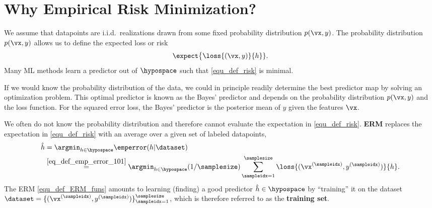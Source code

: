 \documentclass[12pt]{report}
\begin{document}

\section{Why Empirical Risk Minimization?} 
\label{equ_sec_emp_risk_approximates_expected_loss}

We assume that datapoints are i.i.d.\ realizations drawn from some fixed 
probability distribution $p(\vx,y)$. The probability distribution $p(\vx,y)$ 
allows us to define the expected loss or risk 
\begin{equation}
\label{equ_def_risk} 
\expect \big \{ \loss{(\vx,y)}{h} \}.
\end{equation}
Many ML methods learn a predictor out of $\hypospace$ such 
that \eqref{equ_def_risk} is minimal. 

If we would know the probability distribution of the data, we could 
in principle readily determine the best predictor map by solving an 
optimization problem. This optimal predictor is known as the Bayes' 
predictor and depends on the probability distribution $p(\vx,y)$ 
and the loss function. For the squared error loss, the Bayes' 
predictor is the posterior mean of $y$ given the features $\vx$. 

We often do not know the probability distribution and therefore 
cannot evaluate the expectation in \eqref{equ_def_risk}. 
 {\bf ERM} replaces the expectation in  \eqref{equ_def_risk} with an average 
 over a given set of labeled datapoints,  
\begin{align}
\label{equ_def_ERM_funs}
   \hat{h} & = \argmin_{h \in \hypospace} \emperror(h|\dataset) \nonumber \\ 
   & \stackrel{\eqref{eq_def_emp_error_101}}{=}  \argmin_{h \in \hypospace} (1/\samplesize) \sum_{\sampleidx=1}^{\samplesize} \loss{(\vx^{(\sampleidx)},y^{(\sampleidx)})}{h}.
\end{align}
The ERM \eqref{equ_def_ERM_funs} amounts to learning (finding) a 
good predictor $\hat{h} \in \hypospace$ by ``training'' it on the 
dataset $\dataset = \{ (\vx^{(\sampleidx)},y^{(\sampleidx)}) \}_{\sampleidx=1}^{\samplesize}$, 
which is therefore referred to as the {\bf training set}. 
\end{document}
